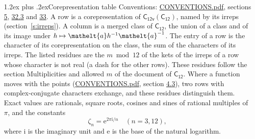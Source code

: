\documentclass[10pt,a4paper]{article}
\makeatletter
\renewcommand\section{\@startsection{section}{1}{\z@}{-3ex plus -1ex minus -.2ex}%
  {1.2ex plus .2ex}{\normalfont\large\sffamily\bfseries\color{parttitle}}}
\numberwithin{equation}{section}
\newcommand{\eltfont}[1]{{\let\sigma\eltsigma\mathelt{#1}}}
\newcommand{\grp}[1]{\mathsf{#1}}
\newcommand{\elt}[1]{\eltfont{#1}}
\newcommand{\iunit}{\mathrm{i}}
\newcommand{\expe}{\mathrm{e}}
\newcommand{\rootunity}[1]{\zeta_{#1}}
\makeatother
\begin{document}
\section{Corepresentation table}\label{s:character_table}
Conventions: \href{../../CONVENTIONS.pdf}{CONVENTIONS.pdf}, sections \href{../../../rotation/CONVENTIONS.pdf\#conv.5}{5}, \href{../../CONVENTIONS.pdf\#conv.32.3}{32.3} and \href{../../CONVENTIONS.pdf\#conv.33}{33}.
A row is a corepresentation of $\grp{C_{12v}}(\grp{C_{12}})$, named by its irreps (section~\ref{s:irreps}). A column is a merged class of $\grp{C_{12}}$, the union of a class and of its image under $h \mapsto \elt{a} h^{-1} \elt{a}^{-1}$. The entry of a row is the character of its corepresentation on the class, the sum of the characters of its irreps.
\leavevmode\label{n:head.parity}The listed residues are the $m \bmod 12$ of the kets of the irreps of a row whose character is not real (a dash for the other rows). These residues follow the section Multiplicities and allowed $m$ of the document of \href{../../../rotation/data/pdf/C12.pdf}{$\grp{C_{12}}$}. Where a function moves with the points (\href{../../CONVENTIONS.pdf}{CONVENTIONS.pdf}, section \href{../../../rotation/CONVENTIONS.pdf\#conv.4.3}{4.3}), two rows with complex-conjugate characters exchange, and these residues distinguish them.
\leavevmode\label{n:constant.root}\label{n:index.root.order}Exact values are rationals, square roots, cosines and sines of rational multiples of $\pi$, and the constants
\begin{equation}\label{e:constants}\rootunity{n} = \expe^{2\pi\iunit/n}\quad(n = 3, 12),\end{equation}
where $\iunit$ is the imaginary unit and $\expe$ is the base of the natural logarithm.
\end{document}
